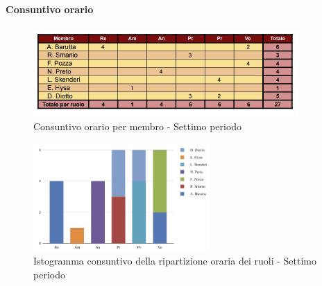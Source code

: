 \pagebreak

\paragraph{Consuntivo orario}

\begin{figure}[H]
    \centering
    \includegraphics[width=0.9\textwidth]{../Images/tabCons7.png}
    \caption{Consuntivo orario per membro - Settimo periodo}
    \label{fig:Constuntivo_orario_7}
\end{figure}

\vspace{0.6cm}

\begin{figure}[H]
    \centering
    \includegraphics[width=0.6\textwidth]{../Images/graficoConsPrev7.png}
    \caption{Istogramma consuntivo della ripartizione oraria dei ruoli - Settimo periodo}
    \label{fig:Consuntivo_ripartizione_oraria_7}
\end{figure}
